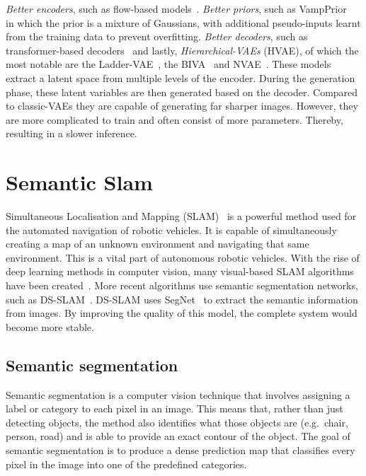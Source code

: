 \emph{Better encoders}, such as flow-based models~\cite{Berg2018SylvesterNF,tomczak2017improving,rezende2015variational}. \emph{Better priors}, such as VampPrior~\cite{tomczak2018vae} in which the prior is a mixture of Gaussians, with additional pseudo-inputs learnt from the training data to prevent overfitting. \emph{Better decoders}, such as transformer-based decoders~\cite{Henderson2022AVA,9054554} and lastly, \emph{Hierarchical-VAEs} (HVAE), of which the most notable are the Ladder-VAE~\cite{NIPS2016_6ae07dcb}, the BIVA~\cite{maaloe2019biva} and NVAE~\cite{vahdat2020nvae}. These models extract a latent space from multiple levels of the encoder. During the generation phase, these latent variables are then generated based on the decoder. Compared to classic-VAEs they are capable of generating far sharper images. However, they are more complicated to train and often consist of more parameters. Thereby, resulting in a slower inference.


\section{Semantic Slam}
Simultaneous Localisation and Mapping (SLAM)~\cite{chatila1985position} is a powerful method used for the automated navigation of robotic vehicles. It is capable of simultaneously creating a map of an unknown environment and navigating that same environment. This is a vital part of autonomous robotic vehicles. With the rise of deep learning methods in computer vision, many visual-based SLAM algorithms have been created~\cite{taketomi2017visual}. More recent algorithms use semantic segmentation networks, such as DS-SLAM~\cite{yu2018ds}. DS-SLAM uses SegNet~\cite{badri2017segnet} to extract the semantic information from images. By improving the quality of this model, the complete system would become more stable.

\subsection{Semantic segmentation}
Semantic segmentation is a computer vision technique that involves assigning a label or category to each pixel in an image. This means that, rather than just detecting objects, the method also identifies what those objects are (e.g.\, chair, person, road) and is able to provide an exact contour of the object. The goal of semantic segmentation is to produce a dense prediction map that classifies every pixel in the image into one of the predefined categories.

